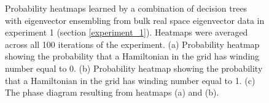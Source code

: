 \documentclass[10pt]{revtex4-1}
\begin{document}


\begin{figure}
\centering
{}
\caption{Probability heatmaps learned by a combination of decision trees with eigenvector ensembling from bulk real space eigenvector data in experiment 1 (section \ref{experiment_1}). Heatmaps were averaged across all 100 iterations of the experiment. (a) Probability heatmap showing the probability that a Hamiltonian in the grid has winding number equal to 0.  (b) Probability heatmap showing the probability that a Hamiltonian in the grid has winding number equal to 1. (c) The phase diagram resulting from heatmaps (a) and (b).}
\label{ssh1_heatmaps}
\end{figure}
\end{document}
